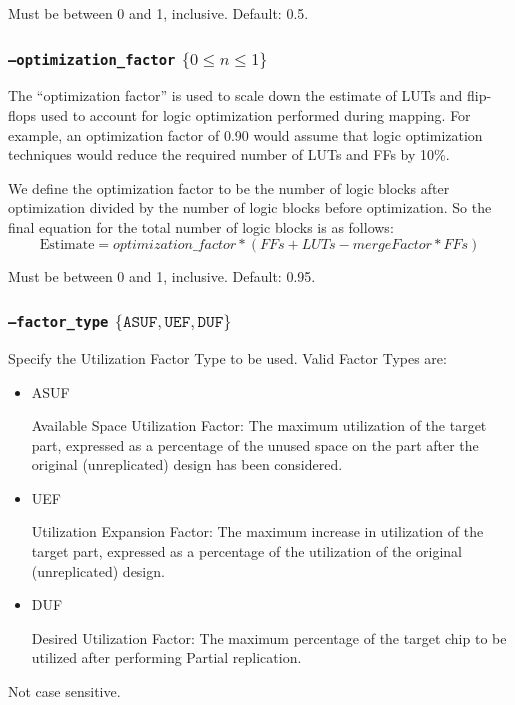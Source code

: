 Must be between 0 and 1, inclusive. Default: 0.5.

\subsubsection{\texttt{--optimization\_factor} $\{ 0 \leq n \leq 1 \}$}
The ``optimization factor'' is used to scale down the estimate of LUTs and 
flip-flops used to account for logic optimization performed during mapping. For 
example, an optimization factor of 0.90 would assume that logic optimization 
techniques would reduce the required number of LUTs and FFs by 10\%.

We define the optimization factor to be the number of logic blocks after 
optimization divided by the number of logic blocks before optimization.  So the 
final equation for the total number of logic blocks is as follows:
\begin{equation*}
\mathrm{Estimate} = optimization\_factor * (FFs + LUTs -  mergeFactor * FFs)
\end{equation*}

Must be between 0 and 1, inclusive. Default: 0.95.

\subsubsection{\texttt{--factor\_type} $\{ \mathtt{ASUF},\mathtt{UEF},\mathtt{DUF} \}$ }
Specify the Utilization Factor Type to be used. Valid Factor Types are:

\begin{itemize}
\item ASUF 

Available Space Utilization Factor: The maximum utilization of the target part,
expressed as a percentage of the unused space on the part after the original
(unreplicated) design has been considered.

\item UEF 

Utilization Expansion Factor: The maximum increase in utilization of the target
part, expressed as a percentage of the utilization of the original
(unreplicated) design.

\item DUF 

Desired Utilization Factor: The maximum percentage of the target chip to be
utilized after performing Partial replication.
\end{itemize}

Not case sensitive.

